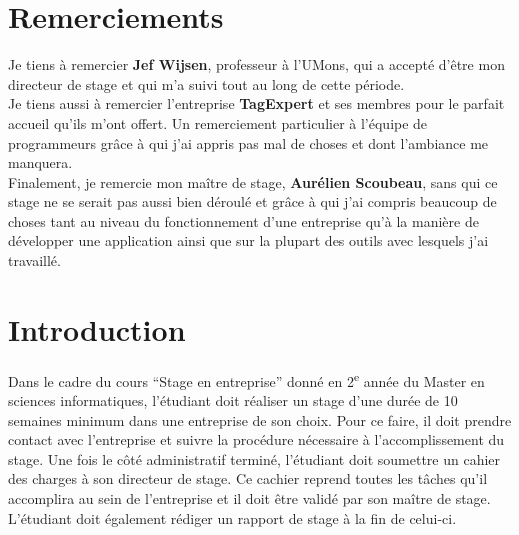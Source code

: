\documentclass{article}
\begin{document}
\begin{sffamily}



\section*{Remerciements}

Je tiens à remercier \textbf{Jef Wijsen}, professeur à l’UMons, qui a accepté d’être mon directeur de stage et qui m’a suivi tout au long de cette période. \\

Je tiens aussi à remercier l'entreprise \textbf{TagExpert} et ses membres pour le parfait accueil qu'ils m'ont offert.
Un remerciement particulier à l'équipe de programmeurs grâce à qui j'ai appris pas mal de choses et dont l'ambiance me manquera.\\

Finalement, je remercie mon maître de stage, \textbf{Aurélien Scoubeau}, sans qui ce stage ne se serait pas aussi bien déroulé
et grâce à qui j'ai compris beaucoup de choses tant au niveau du fonctionnement d'une entreprise qu'à la manière de développer une application
ainsi que sur la plupart des outils avec lesquels j'ai travaillé.


\newpage

\hbox{}

\tableofcontents

\vspace*{1cm}

\hbox{}

\newpage


\section{Introduction}

Dans le cadre du cours ``Stage en entreprise'' donné en 2\textsuperscript{e} année du Master en sciences informatiques, l'étudiant doit réaliser un stage d'une durée de 10 
semaines minimum dans une entreprise de son choix. Pour ce faire, il doit prendre contact avec l'entreprise et suivre la procédure nécessaire à l'accomplissement du stage. 
Une fois le côté administratif terminé, l'étudiant doit soumettre un cahier des charges à son directeur de stage. Ce cachier reprend toutes les tâches qu'il accomplira au 
sein de l'entreprise et il doit être validé par son maître de stage.  L'étudiant doit également rédiger un rapport de stage à la fin de celui-ci.\\


\end{sffamily}
\end{document}
